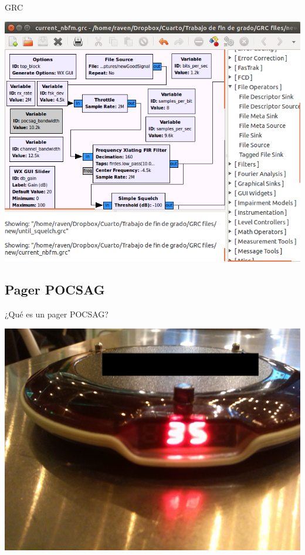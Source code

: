 \documentclass{beamer}
\begin{document}
\begin{frame}{GRC}

\begin{center}
\includegraphics[scale=0.3]{grc.png}
\end{center}

\end{frame}

\subsection{Pager POCSAG}

\begin{frame}{¿Qué es un pager POCSAG?}

\begin{center}
\includegraphics[scale=0.08]{pagerfront.jpg}
\end{center}

\end{frame}
\end{document}
